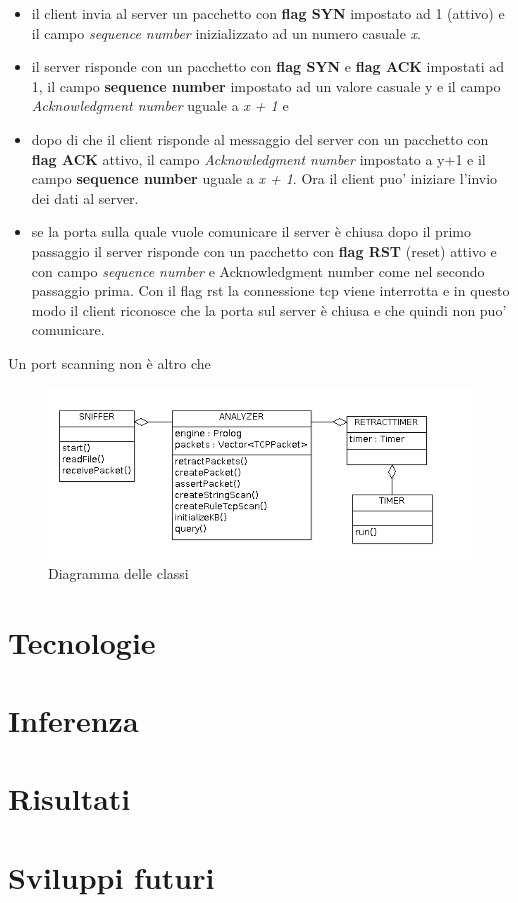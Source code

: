 \documentclass[a4paper,12pt]{article} %
\begin{document}
\begin{itemize}

\item il client invia al server un pacchetto con \textbf{flag SYN} impostato ad 1 (attivo) e il campo \emph{sequence number}
inizializzato ad un numero casuale \emph{x}.


\item il server risponde con un pacchetto con \textbf{flag SYN} e \textbf{flag ACK} impostati ad 1, il campo \textbf{sequence number}
impostato ad un valore casuale y e il campo \emph{Acknowledgment number} uguale a \emph{x + 1} e 

\item dopo di che il client risponde al messaggio del server con un pacchetto con \textbf{flag ACK} attivo, il campo \emph{Acknowledgment number} impostato a y+1 e il campo \textbf{sequence number} uguale a \emph{x + 1}. Ora il client puo' iniziare
l'invio dei dati al server.


\item se la porta sulla quale vuole comunicare il server è chiusa dopo il primo passaggio il server risponde con un pacchetto
con \textbf{flag RST} (reset) attivo e con campo \emph{sequence number} e {Acknowledgment number} come nel secondo passaggio prima. Con il flag rst la connessione tcp viene interrotta e in questo modo il client riconosce che la porta sul server è chiusa e che quindi
non puo' comunicare.


\end{itemize}

\newpage

Un port scanning non è altro che 



\begin{figure}[htbp]
\centering
\includegraphics[width=15cm]{classi.png}
\caption{\label{Diagramma delle classi} Diagramma delle classi}
\end{figure}






\section{Tecnologie}


\section{Inferenza}


\section{Risultati}



\section{Sviluppi futuri}
\end{document}
